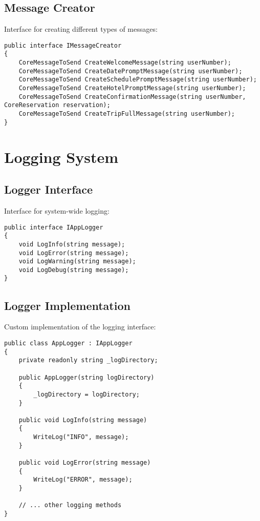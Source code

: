 \subsection{Message Creator}
Interface for creating different types of messages:

\begin{lstlisting}[language=CSharp]
public interface IMessageCreator
{
    CoreMessageToSend CreateWelcomeMessage(string userNumber);
    CoreMessageToSend CreateDatePromptMessage(string userNumber);
    CoreMessageToSend CreateSchedulePromptMessage(string userNumber);
    CoreMessageToSend CreateHotelPromptMessage(string userNumber);
    CoreMessageToSend CreateConfirmationMessage(string userNumber, CoreReservation reservation);
    CoreMessageToSend CreateTripFullMessage(string userNumber);
}
\end{lstlisting}

\section{Logging System}

\subsection{Logger Interface}
Interface for system-wide logging:

\begin{lstlisting}[language=CSharp]
public interface IAppLogger
{
    void LogInfo(string message);
    void LogError(string message);
    void LogWarning(string message);
    void LogDebug(string message);
}
\end{lstlisting}

\subsection{Logger Implementation}
Custom implementation of the logging interface:

\begin{lstlisting}[language=CSharp]
public class AppLogger : IAppLogger
{
    private readonly string _logDirectory;
    
    public AppLogger(string logDirectory)
    {
        _logDirectory = logDirectory;
    }
    
    public void LogInfo(string message)
    {
        WriteLog("INFO", message);
    }
    
    public void LogError(string message)
    {
        WriteLog("ERROR", message);
    }
    
    // ... other logging methods
}
\end{lstlisting}

